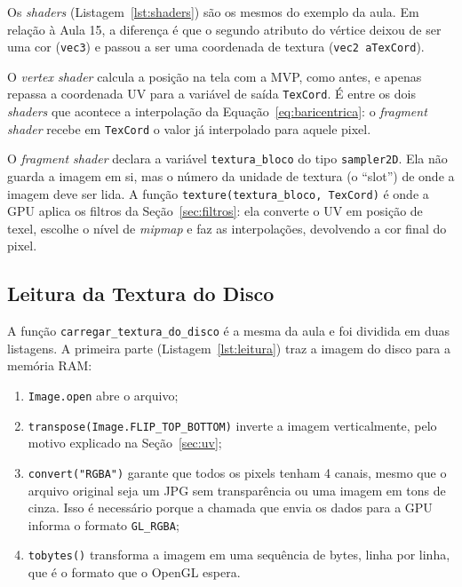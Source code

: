 \documentclass{article}
\begin{document}


Os \textit{shaders} (Listagem~\ref{lst:shaders}) são os mesmos do exemplo da aula. Em relação à Aula 15, a diferença é que o segundo atributo do vértice deixou de ser uma cor (\texttt{vec3}) e passou a ser uma coordenada de textura (\texttt{vec2 aTexCord}).

O \textit{vertex shader} calcula a posição na tela com a MVP, como antes, e apenas repassa a coordenada UV para a variável de saída \texttt{TexCord}. É entre os dois \textit{shaders} que acontece a interpolação da Equação~\ref{eq:baricentrica}: o \textit{fragment shader} recebe em \texttt{TexCord} o valor já interpolado para aquele pixel.

O \textit{fragment shader} declara a variável \texttt{textura\_bloco} do tipo \texttt{sampler2D}. Ela não guarda a imagem em si, mas o número da unidade de textura (o ``slot'') de onde a imagem deve ser lida. A função \texttt{texture(textura\_bloco, TexCord)} é onde a GPU aplica os filtros da Seção~\ref{sec:filtros}: ela converte o UV em posição de texel, escolhe o nível de \textit{mipmap} e faz as interpolações, devolvendo a cor final do pixel.



\subsection{Leitura da Textura do Disco}

A função \texttt{carregar\_textura\_do\_disco} é a mesma da aula e foi dividida em duas listagens. A primeira parte (Listagem~\ref{lst:leitura}) traz a imagem do disco para a memória RAM:

\begin{enumerate}
    \item \texttt{Image.open} abre o arquivo;
    \item \texttt{transpose(Image.FLIP\_TOP\_BOTTOM)} inverte a imagem verticalmente, pelo motivo explicado na Seção~\ref{sec:uv};
    \item \texttt{convert("RGBA")} garante que todos os pixels tenham 4 canais, mesmo que o arquivo original seja um JPG sem transparência ou uma imagem em tons de cinza. Isso é necessário porque a chamada que envia os dados para a GPU informa o formato \texttt{GL\_RGBA};
    \item \texttt{tobytes()} transforma a imagem em uma sequência de bytes, linha por linha, que é o formato que o OpenGL espera.
\end{enumerate}
\end{document}
